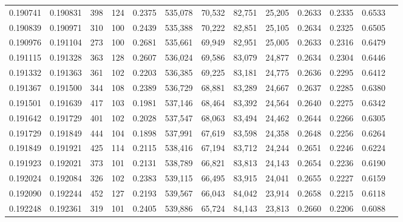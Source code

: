 \begin{tabular}{rrrrrrrrrrrrr}
0.190741 & 0.190831 &   398 & 124 &                                     0.2375 & 535,078 &  70,532 &  82,751 &  25,205 & 0.2633 & 0.2335 & 0.6533 \\
0.190839 & 0.190971 &   310 & 100 &                                     0.2439 & 535,388 &  70,222 &  82,851 &  25,105 & 0.2634 & 0.2325 & 0.6505 \\
0.190976 & 0.191104 &   273 & 100 &                                     0.2681 & 535,661 &  69,949 &  82,951 &  25,005 & 0.2633 & 0.2316 & 0.6479 \\
0.191115 & 0.191328 &   363 & 128 &                                     0.2607 & 536,024 &  69,586 &  83,079 &  24,877 & 0.2634 & 0.2304 & 0.6446 \\
0.191332 & 0.191363 &   361 & 102 &                                     0.2203 & 536,385 &  69,225 &  83,181 &  24,775 & 0.2636 & 0.2295 & 0.6412 \\
0.191367 & 0.191500 &   344 & 108 &                                     0.2389 & 536,729 &  68,881 &  83,289 &  24,667 & 0.2637 & 0.2285 & 0.6380 \\
0.191501 & 0.191639 &   417 & 103 &                                     0.1981 & 537,146 &  68,464 &  83,392 &  24,564 & 0.2640 & 0.2275 & 0.6342 \\
0.191642 & 0.191729 &   401 & 102 &                                     0.2028 & 537,547 &  68,063 &  83,494 &  24,462 & 0.2644 & 0.2266 & 0.6305 \\
0.191729 & 0.191849 &   444 & 104 &                                     0.1898 & 537,991 &  67,619 &  83,598 &  24,358 & 0.2648 & 0.2256 & 0.6264 \\
0.191849 & 0.191921 &   425 & 114 &                                     0.2115 & 538,416 &  67,194 &  83,712 &  24,244 & 0.2651 & 0.2246 & 0.6224 \\
0.191923 & 0.192021 &   373 & 101 &                                     0.2131 & 538,789 &  66,821 &  83,813 &  24,143 & 0.2654 & 0.2236 & 0.6190 \\
0.192024 & 0.192084 &   326 & 102 &                                     0.2383 & 539,115 &  66,495 &  83,915 &  24,041 & 0.2655 & 0.2227 & 0.6159 \\
0.192090 & 0.192244 &   452 & 127 &                                     0.2193 & 539,567 &  66,043 &  84,042 &  23,914 & 0.2658 & 0.2215 & 0.6118 \\
0.192248 & 0.192361 &   319 & 101 &                                     0.2405 & 539,886 &  65,724 &  84,143 &  23,813 & 0.2660 & 0.2206 & 0.6088 \\

\end{tabular}
